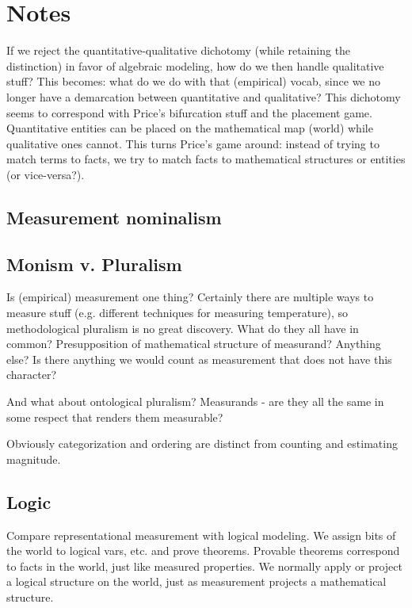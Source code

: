 \documentclass[11pt,twoside]{article}
\begin{document}
\noindent
\cite{smith_refining_2011}

\section{Notes}

If we reject the quantitative-qualitative dichotomy (while retaining
the distinction) in favor of algebraic modeling, how do we then handle
qualitative stuff?  This becomes: what do we do with that (empirical)
vocab, since we no longer have a demarcation between quantitative and
qualitative?  This dichotomy seems to correspond with Price's
bifurcation stuff and the placement game.  Quantitative entities can
be placed on the mathematical map (world) while qualitative ones
cannot.  This turns Price's game around: instead of trying to match
terms to facts, we try to match facts to mathematical structures or
entities (or vice-versa?).

\subsection{Measurement nominalism}

\subsection{Monism v. Pluralism}

Is (empirical) measurement one thing?  Certainly there are multiple
ways to measure stuff (e.g. different techniques for measuring
temperature), so methodological pluralism is no great discovery.  What
do they all have in common?  Presupposition of mathematical structure
of measurand?  Anything else?  Is there anything we would count as
measurement that does not have this character?

And what about ontological pluralism?  Measurands - are they all the
same in some respect that renders them measurable?

Obviously categorization and ordering are distinct from counting and
estimating magnitude.

\subsection{Logic}

Compare representational measurement with logical modeling.  We assign
bits of the world to logical vars, etc. and prove theorems.  Provable
theorems correspond to facts in the world, just like measured
properties.  We normally apply or project a logical structure on the
world, just as measurement projects a mathematical structure.
\end{document}
